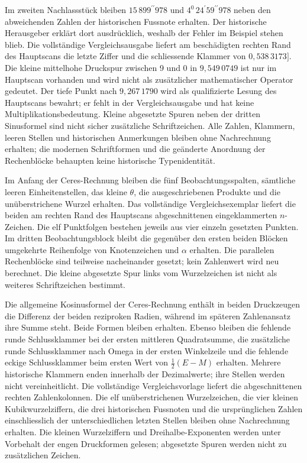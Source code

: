 Im zweiten Nachlassstück bleiben $15\,899^{\prime\prime}978$ und $4^0\,24^{\prime}59^{\prime\prime}978$ neben den abweichenden Zahlen der historischen Fussnote erhalten. Der historische Herausgeber erklärt dort ausdrücklich, weshalb der Fehler im Beispiel stehen blieb. Die vollständige Vergleichsausgabe liefert am beschädigten rechten Rand des Hauptscans die letzte Ziffer und die schliessende Klammer von $0{,}538\,3173]$. Die kleine mittelhohe Druckspur zwischen 9 und 0 in $9{,}549\,0749$ ist nur im Hauptscan vorhanden und wird nicht als zusätzlicher mathematischer Operator gedeutet. Der tiefe Punkt nach $9{,}267\,1790$ wird als qualifizierte Lesung des Hauptscans bewahrt; er fehlt in der Vergleichsausgabe und hat keine Multiplikationsbedeutung. Kleine abgesetzte Spuren neben der dritten Sinusformel sind nicht sicher zusätzliche Schriftzeichen. Alle Zahlen, Klammern, leeren Stellen und historischen Anmerkungen bleiben ohne Nachrechnung erhalten; die modernen Schriftformen und die geänderte Anordnung der Rechenblöcke behaupten keine historische Typenidentität.

Im Anfang der Ceres-Rechnung bleiben die fünf Beobachtungsspalten, sämtliche leeren Einheitenstellen, das kleine $\theta$, die ausgeschriebenen Produkte und die unüberstrichene Wurzel erhalten. Das vollständige Vergleichsexemplar liefert die beiden am rechten Rand des Hauptscans abgeschnittenen eingeklammerten $n$-Zeichen. Die elf Punktfolgen bestehen jeweils aus vier einzeln gesetzten Punkten. Im dritten Beobachtungsblock bleibt die gegenüber den ersten beiden Blöcken umgekehrte Reihenfolge von Knotenzeichen und $\alpha$ erhalten. Die parallelen Rechenblöcke sind teilweise nacheinander gesetzt; kein Zahlenwert wird neu berechnet. Die kleine abgesetzte Spur links vom Wurzelzeichen ist nicht als weiteres Schriftzeichen bestimmt.

Die allgemeine Kosinusformel der Ceres-Rechnung enthält in beiden Druckzeugen die Differenz der beiden reziproken Radien, während im späteren Zahlenansatz ihre Summe steht. Beide Formen bleiben erhalten. Ebenso bleiben die fehlende runde Schlussklammer bei der ersten mittleren Quadratsumme, die zusätzliche runde Schlussklammer nach Omega in der ersten Winkelzeile und die fehlende eckige Schlussklammer beim ersten Wert von $\tfrac12(E-M)$ erhalten. Mehrere historische Klammern enden innerhalb der Dezimalwerte; ihre Stellen werden nicht vereinheitlicht. Die vollständige Vergleichsvorlage liefert die abgeschnittenen rechten Zahlenkolonnen. Die elf unüberstrichenen Wurzelzeichen, die vier kleinen Kubikwurzelziffern, die drei historischen Fussnoten und die ursprünglichen Zahlen einschliesslich der unterschiedlichen letzten Stellen bleiben ohne Nachrechnung erhalten. Die kleinen Wurzelziffern und Dreihalbe-Exponenten werden unter Vorbehalt der engen Druckformen gelesen; abgesetzte Spuren werden nicht zu zusätzlichen Zeichen.

